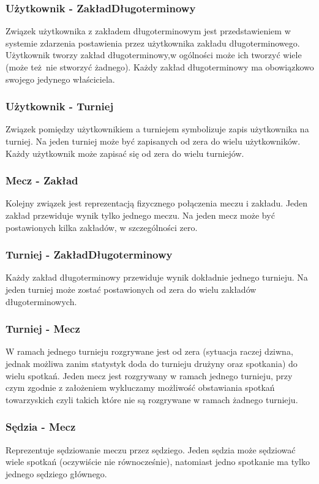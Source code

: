 \documentclass{mwrep}
\begin{document}
\subsubsection{Użytkownik - ZakładDługoterminowy}
Związek użytkownika z zakładem długoterminowym jest przedstawieniem w systemie zdarzenia postawienia przez użytkownika zakładu długoterminowego. Użytkownik tworzy zakład długoterminowy,w ogólności może ich tworzyć wiele (może też nie stworzyć żadnego). Każdy zakład długoterminowy ma obowiązkowo swojego jedynego właściciela.

\subsubsection{Użytkownik - Turniej}
Związek pomiędzy użytkownikiem a turniejem symbolizuje zapis użytkownika na turniej. Na jeden turniej może być zapisanych od zera do wielu użytkowników. Każdy użytkownik może zapisać się od zera do wielu turniejów.

\subsubsection{Mecz - Zakład} 
Kolejny związek jest reprezentacją fizycznego połączenia meczu i zakładu. Jeden zakład przewiduje wynik
tylko jednego meczu. Na jeden mecz może być postawionych kilka zakładów, w szczególności zero.

\subsubsection{Turniej - ZakładDługoterminowy}
Każdy zakład długoterminowy przewiduje wynik dokładnie jednego turnieju. Na jeden turniej może zostać
postawionych od zera do wielu zakładów długoterminowych.

\subsubsection{Turniej - Mecz}
W ramach jednego turnieju rozgrywane jest od zera (sytuacja raczej dziwna, jednak możliwa zanim statystyk doda do turnieju drużyny oraz spotkania) do wielu
spotkań. Jeden mecz jest rozgrywany w ramach jednego turnieju, przy czym zgodnie z założeniem wykluczamy możliwość
obstawiania spotkań towarzyskich czyli takich które nie są rozgrywane w ramach żadnego turnieju.

\subsubsection{Sędzia - Mecz}
Reprezentuje sędziowanie meczu przez sędziego. Jeden sędzia może sędziować wiele spotkań (oczywiście nie równocześnie), natomiast 
jedno spotkanie ma tylko jednego sędziego głównego.
\end{document}

